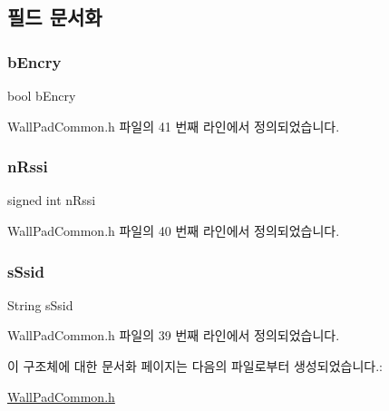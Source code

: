 \subsection{필드 문서화}
\mbox{\label{struct_st_ap_list_a3491c9e85ee7dced99ca9b0ff6ea0327}} 
\subsubsection{\texorpdfstring{b\+Encry}{bEncry}}
{\footnotesize\ttfamily bool b\+Encry}



Wall\+Pad\+Common.\+h 파일의 41 번째 라인에서 정의되었습니다.

\mbox{\label{struct_st_ap_list_a04d6ede44986822269e924bb50a48369}} 
\subsubsection{\texorpdfstring{n\+Rssi}{nRssi}}
{\footnotesize\ttfamily signed int n\+Rssi}



Wall\+Pad\+Common.\+h 파일의 40 번째 라인에서 정의되었습니다.

\mbox{\label{struct_st_ap_list_a174040ae2c2468aa44f5c18ad915e7a3}} 
\subsubsection{\texorpdfstring{s\+Ssid}{sSsid}}
{\footnotesize\ttfamily String s\+Ssid}



Wall\+Pad\+Common.\+h 파일의 39 번째 라인에서 정의되었습니다.



이 구조체에 대한 문서화 페이지는 다음의 파일로부터 생성되었습니다.\+:\begin{DoxyCompactItemize}
\item 
\mbox{\hyperlink{_wall_pad_common_8h}{Wall\+Pad\+Common.\+h}}\end{DoxyCompactItemize}
